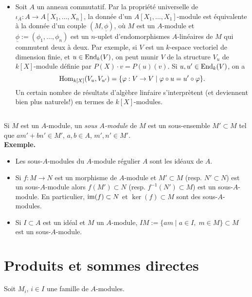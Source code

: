 \documentclass[a4paper, oneside, 12pt]{book}
\theoremstyle{definition} %
\begin{document}
\begin{itemize}[leftmargin=* ,parsep=0cm,itemsep=0cm,topsep=0cm]
\item Soit $A$ un anneau commutatif. Par la propriété universelle de $\iota_A:A\rightarrow A[X_1,\dots, X_n]$, la donnée d'un $A[X_1,\dots,X_1]$-module est équivalente à la donnée d'un couple $(M,\underline{\phi})$, où $M$ est un $A$-module et $\underline{\phi}:=(\phi_{1},\dots,\phi_{n})$ est un $n$-uplet d'endomorphismes $A$-linéaires de $M$ qui commutent deux à deux. Par exemple, si $V$ est un $k$-espace vectoriel de dimension finie, et $u\in \hbox{\rm End}_k(V)$, on peut munir $V$ de la structure $V_u$ de $k[X]$-module définie par $P(X)\cdot v=P(u)(v)$. Si $u,u'\in\hbox{\rm End}_k(V) $, on a 
$$\hbox{\rm Hom}_{k[X]}(V_u,V_{u'})=\lbrace \varphi:V\rightarrow V\; |\; \varphi\circ u=u'\circ \varphi\rbrace.$$
Un certain nombre de résultats d'algèbre lin\'raire s'interprètent (et deviennent bien plus naturels!) en termes de $k[X]$-modules.\\
\end{itemize} 

 \subsection{}Si $M$ est un $A$-module, un \textit{sous $A$-module} de $M$ est un sous-ensemble $M'\subset M$ tel que $am'+bn'\in M'$, $a,b\in A $, $m',n'\in M'$. \\
 
 \textbf{Exemple.}
 \begin{itemize}[leftmargin=* ,parsep=0cm,itemsep=0cm,topsep=0cm] 
 \item Les sous-$A$-modules du $A$-module régulier $A$ sont les idéaux de $A$.\\
\item Si $f:M\rightarrow N$ est un morphisme de $A$-module et $M'\subset M$ (resp. $N'\subset N$) est un sous-$A$-module alors $f(M')\subset N$ (resp. $f^{-1}(N')\subset M$) est un sous-$A$-module. En particulier, $\hbox{\rm im}(f)\subset N$ et $\ker(f)\subset M$ sont des sous-$A$-modules.\\
\item Si $I\subset A$ est un idéal et $M$ un $A$-module, $IM:=\lbrace am\; |\; a\in I,\; m\in M\rbrace\subset M$ est un sous-$A$-module.

\end{itemize} 

 

\section{Produits et sommes directes}
 Soit $M_{i}$, $i\in I$ une famille de $A$-modules.\\
\end{document}
